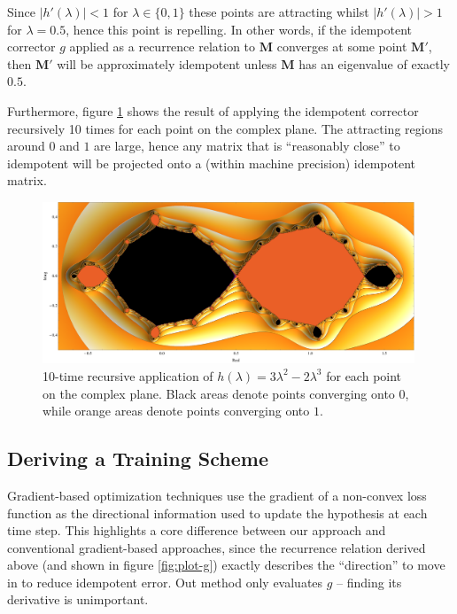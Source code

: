 \documentclass{article}
\theoremstyle{plain}
\theoremstyle{definition}
\theoremstyle{remark}
\newcommand{\vM}{\mathbf{M}}
\begin{document}
Since $|h'(\lambda)| < 1$ for $\lambda \in \{0, 1\}$ these points are attracting whilst $|h'(\lambda)| > 1$ for $\lambda = 0.5$, hence this point is repelling. In other words, if the idempotent corrector $g$ applied as a recurrence relation to $\vM$ converges at some point $\vM'$, then $\vM'$ will be approximately idempotent unless $\vM$ has an eigenvalue of exactly $0.5$.

Furthermore, figure \ref{fig:fractal} shows the result of applying the idempotent corrector recursively 10 times for each point on the complex plane. The attracting regions around $0$ and $1$ are large, hence any matrix that is ``reasonably close'' to idempotent will be projected onto a (within machine precision) idempotent matrix.

\begin{figure}[!htp]
    \centering
    \includegraphics[width=0.99\textwidth]{./resources/fractal.pdf}
    \caption{10-time recursive application of $h(\lambda) = 3\lambda^2 - 2\lambda^3$ for each point on the complex plane. Black areas denote points converging onto $0$, while orange areas denote points converging onto $1$.}
    \label{fig:fractal}
\end{figure}



\subsection{Deriving a Training Scheme}
Gradient-based optimization techniques use the gradient of a non-convex loss function as the directional information used to update the hypothesis at each time step. This highlights a core difference between our approach and conventional gradient-based approaches, since the recurrence relation derived above (and shown in figure \ref{fig:plot-g}) exactly describes the ``direction'' to move in to reduce idempotent error. Out method only evaluates $g$ -- finding its derivative is unimportant.
\end{document}
